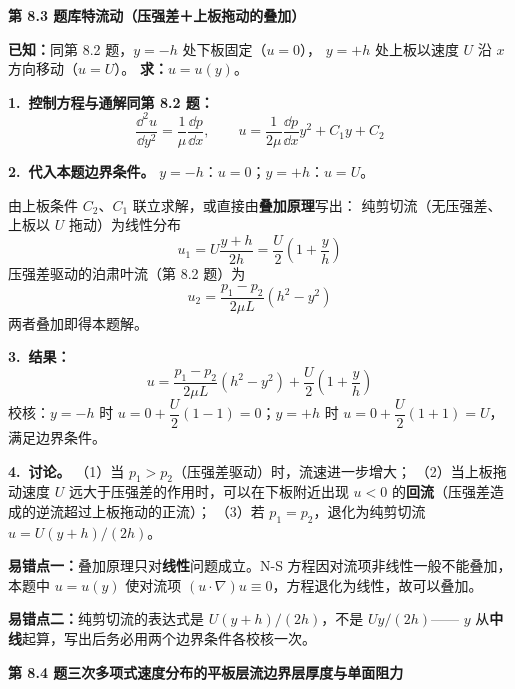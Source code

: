\noindent\textbf{第 8.3 题\quad 库特流动（压强差＋上板拖动的叠加）}

\begin{jie}
\textbf{已知：}同第 8.2 题，$y=-h$ 处下板固定（$u=0$），
$y=+h$ 处上板以速度 $U$ 沿 $x$ 方向移动（$u=U$）。
\textbf{求：}$u=u(y)$。

\textbf{1.\ 控制方程与通解同第 8.2 题：}
\[
\frac{\dd^2u}{\dd y^2}=\frac{1}{\mu}\frac{\dd p}{\dd x},
\qquad
u=\frac{1}{2\mu}\frac{\dd p}{\dd x}y^2+C_1y+C_2
\]

\textbf{2.\ 代入本题边界条件。}
$y=-h$：$u=0$；\quad $y=+h$：$u=U$。

由上板条件 $C_2$、$C_1$ 联立求解，或直接由\textbf{叠加原理}写出：
纯剪切流（无压强差、上板以 $U$ 拖动）为线性分布
\[
u_1=U\frac{y+h}{2h}=\frac{U}{2}\left(1+\frac{y}{h}\right)
\]
压强差驱动的泊肃叶流（第 8.2 题）为
\[
u_2=\frac{p_1-p_2}{2\mu L}\left(h^2-y^2\right)
\]
两者叠加即得本题解。

\textbf{3.\ 结果：}
\[
\boxed{\,u=\frac{p_1-p_2}{2\mu L}\left(h^2-y^2\right)+\frac{U}{2}\left(1+\frac{y}{h}\right)\,}
\]
校核：$y=-h$ 时 $u=0+\dfrac{U}{2}(1-1)=0$；$y=+h$ 时 $u=0+\dfrac{U}{2}(1+1)=U$，满足边界条件。

\textbf{4.\ 讨论。}
（1）当 $p_1>p_2$（压强差驱动）时，流速进一步增大；
（2）当上板拖动速度 $U$ 远大于压强差的作用时，可以在下板附近出现
$u<0$ 的\textbf{回流}（压强差造成的逆流超过上板拖动的正流）；
（3）若 $p_1=p_2$，退化为纯剪切流 $u=U(y+h)/(2h)$。
\end{jie}

\begin{yicuo}
\textbf{易错点一：}叠加原理只对\textbf{线性}问题成立。N-S 方程因对流项非线性一般不能叠加，
本题中 $u=u(y)$ 使对流项 $(u\cdot\nabla)u\equiv0$，方程退化为线性，故可以叠加。

\textbf{易错点二：}纯剪切流的表达式是 $U(y+h)/(2h)$，不是 $Uy/(2h)$——
$y$ 从\textbf{中线}起算，写出后务必用两个边界条件各校核一次。
\end{yicuo}

\noindent\textbf{第 8.4 题\quad 三次多项式速度分布的平板层流边界层厚度与单面阻力}

